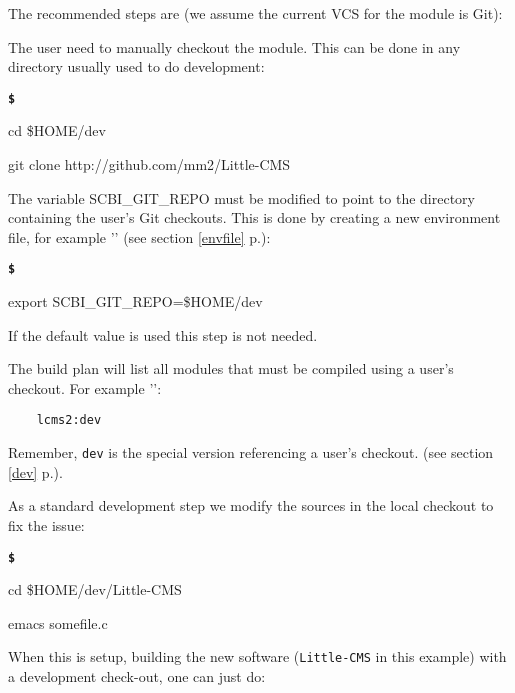 \documentclass[a4paper,12pt,twoside]{article}
\newenvironment{shellcommand}{
	\begin{list}{ %
			\bfseries\texttt \$
		}{ %
			\ttfamily
			\setlength{\topsep}{-0.3ex}
			\setlength{\labelwidth}{1in}
			\setlength{\leftmargin}{0.7in}
			\setlength{\labelsep}{0.5ex}
			\setlength{\rightmargin}{0.5in}
			\setlength{\itemsep}{1ex}
			\setlength{\parsep}{0ex}
			\setlength{\listparindent}{0.5in}
		}
	}{
	\end{list}
}
\newcommand{\code}[1]{\texttt{#1}}
\newcommand{\seeref}[1]{see section \ref{#1} p.\pageref{#1}}
\newcommand{\file}[1]{'{\path{#1}}'}
\begin{document}
The recommended steps are (we assume the current VCS for the module is Git):

\begin{description}[style=nextline]
	\item[Checkout the module] The user need to manually checkout the module. This can be done in any directory usually used to do development:

	\begin{shellcommand}
	\item cd \$HOME/dev
	\item git clone http://github.com/mm2/Little-CMS
	\end{shellcommand}

	\item[Setup SCBI enviroment] The variable SCBI\_GIT\_REPO must be modified to point to the directory containing the user's Git checkouts. This is done by creating a new environment file, for example \file{.env-debug} (\seeref{envfile}):

	\begin{shellcommand}
	\item export SCBI\_GIT\_REPO=\$HOME/dev
	\end{shellcommand}

	If the default value is used this step is not needed.

	\item[Create a build plan] The build plan will list all modules that must be compiled using a user's checkout. For example \file{.plan-debug}:

	\begin{lstlisting}
	lcms2:dev
	\end{lstlisting}

	Remember, \code{dev} is the special version referencing a user's checkout. (\seeref{dev}).

	\item[Modify the module's sources] As a standard development step we modify the sources in the local checkout to fix the issue:

	\begin{shellcommand}
	\item cd \$HOME/dev/Little-CMS
	\item emacs somefile.c
	\end{shellcommand}

\end{description}

When this is setup, building the new software (\code{Little-CMS} in this example) with a development check-out, one can just do:
\end{document}
